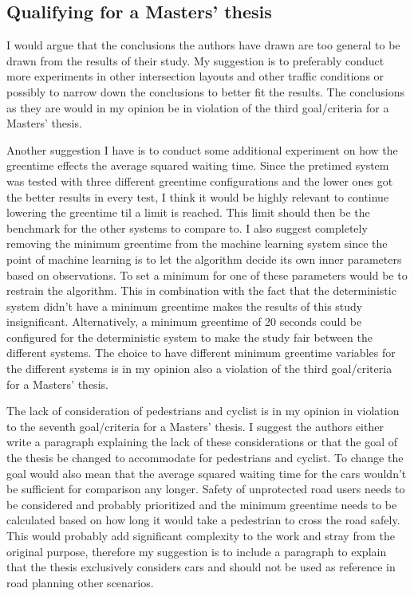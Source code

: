 \documentclass[10pt, a4paper]{article}
\begin{document}
\subsection{Qualifying for a Masters' thesis}
I would argue that the conclusions the authors have drawn are too general to be drawn from the results of their study. My suggestion is to
preferably conduct more experiments in other intersection layouts and other traffic conditions or possibly to narrow down the conclusions
to better fit the results. The conclusions as they are would in my opinion be in violation of the third goal/criteria for a Masters' thesis.

Another suggestion I have is to conduct some additional experiment on how the greentime effects the average squared waiting time. Since the
pretimed system was tested with three different greentime configurations and the lower ones got the better results in every test, I think it 
would be highly relevant to continue lowering the greentime til a limit is reached. This limit should then be the benchmark for the other systems
to compare to. I also suggest completely removing the minimum greentime from the machine learning system since the point of machine learning is
to let the algorithm decide its own inner parameters based on observations. To set a minimum for one of these parameters would be to restrain
the algorithm. This in combination with the fact that the deterministic system didn't have a minimum greentime makes the results of this study
insignificant. Alternatively, a minimum greentime of 20 seconds could be configured for the deterministic system to make the study fair
between the different systems. The choice to have different minimum greentime variables for the different systems is in my opinion also a violation
of the third goal/criteria for a Masters' thesis.


The lack of consideration of pedestrians and cyclist is in my opinion in violation to the seventh goal/criteria for a Masters' thesis. I suggest
the authors either write a paragraph explaining the lack of these considerations or that the goal of the thesis be changed to accommodate for
pedestrians and cyclist. To change the goal would also mean that the average squared waiting time for the cars wouldn't be sufficient for comparison
any longer. Safety of unprotected road users needs to be considered and probably prioritized and the minimum greentime needs to be calculated based
on how long it would take a pedestrian to cross the road safely. This would probably add significant complexity to the work and stray from the original
purpose, therefore my suggestion is to include a paragraph to explain that the thesis exclusively considers cars and should not be used as reference
in road planning other scenarios.
\newline
\end{document}
